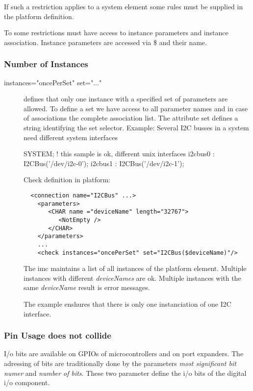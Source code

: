 If such a restriction applies  to a system element some rules must be supplied 
in the platform definition.

To some restrictions must have access to instance parameters and instance association.
Instance parameters are accessed via \$ and their name.

\subsubsection{Number of Instances}
\begin{description}
\item[instances="oncePerSet" set="..."] defines that only one instance with a 
  specified set of parameters are allowed. To define a set we have access to 
  all parameter names and in case of associations the complete association list.
  The attribute set defines a string identifying the set selector. 
  \newline
  Example: Several I2C busses in a system need different system interfaces

  \begin{PEARLCode}
  SYSTEM;
     ! this sample is ok, different unix interfaces
     i2cbus0 : I2CBus('/dev/i2c-0');
     i2cbus1 : I2CBus('/dev/i2c-1');
  \end{PEARLCode}

  Check definition in platform:
  
  \begin{verbatim}
  <connection name="I2CBus" ...>
    <parameters>
       <CHAR name ="deviceName" length="32767">
          <NotEmpty />
       </CHAR>
    </parameters>
    ...
    <check instances="oncePerSet" set="I2CBus($deviceName)"/>
  \end{verbatim}

  The imc maintains a list of all instances of the platform element.
  Multiple instances with different \textit{deviceNames} are ok.
  Multiple instances with the same \textit{deviceName} result is
  error messages.

  The example enshures that there is only one instanciation of 
  one I2C interface. 
\end{description}

\subsubsection{Pin Usage does not collide}
I/o bits are available on GPIOs of microcontrollers and on port expanders.
The adressing of bits are traditionally done by the parameters
\textit{most significant bit numer} and
\textit{number of bits}. These two parameter define the i/o bits of the 
digital i/o component.

